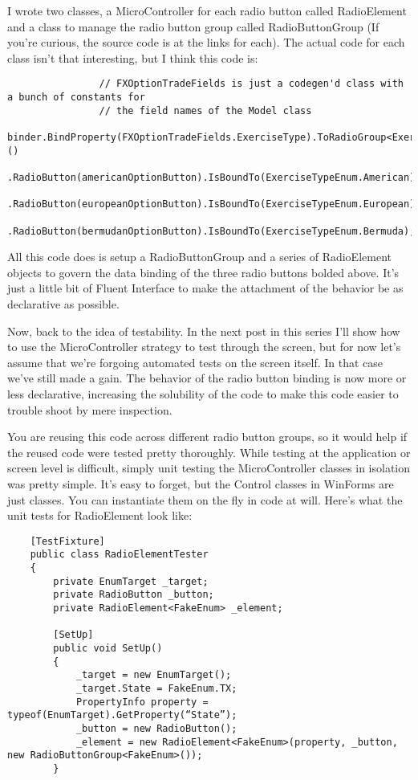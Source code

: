 \documentclass{article}
\begin{document}
{I wrote two classes, a MicroController for each radio button called RadioElement and a class to manage the radio button group called RadioButtonGroup (If you're curious, the source code is at the links for each).  The actual code for each class isn't that interesting, but I think this code is: 

\begin{lstlisting}
                // FXOptionTradeFields is just a codegen'd class with a bunch of constants for 
                // the field names of the Model class
                binder.BindProperty(FXOptionTradeFields.ExerciseType).ToRadioGroup<ExerciseTypeEnum>()
                    .RadioButton(americanOptionButton).IsBoundTo(ExerciseTypeEnum.American)
                    .RadioButton(europeanOptionButton).IsBoundTo(ExerciseTypeEnum.European)
                    .RadioButton(bermudanOptionButton).IsBoundTo(ExerciseTypeEnum.Bermuda);
\end{lstlisting}

All this code does is setup a RadioButtonGroup and a series of RadioElement objects to govern the data binding of the three radio buttons bolded above.   It's just a little bit of Fluent Interface to make the attachment of the behavior be as declarative as possible.

Now, back to the idea of testability.  In the next post in this series I'll show how to use the MicroController strategy to test through the screen, but for now let's assume that we're forgoing automated tests on the screen itself.  In that case we've still made a gain.  The behavior of the radio button binding is now more or less declarative, increasing the solubility of the code to make this code easier to trouble shoot by mere inspection.

You are reusing this code across different radio button groups, so it would help if the reused code were tested pretty thoroughly.  While testing at the application or screen level is difficult, simply unit testing the MicroController classes in isolation was pretty simple.  It's easy to forget, but the Control classes in WinForms are just classes.  You can instantiate them on the fly in code at will.  Here's what the unit tests for RadioElement look like:
\newpage
 \begin{lstlisting}
    [TestFixture]
    public class RadioElementTester
    {
        private EnumTarget _target;
        private RadioButton _button;
        private RadioElement<FakeEnum> _element; 

        [SetUp]
        public void SetUp()
        {
            _target = new EnumTarget();
            _target.State = FakeEnum.TX;
            PropertyInfo property = typeof(EnumTarget).GetProperty(“State”);
            _button = new RadioButton();
            _element = new RadioElement<FakeEnum>(property, _button, new RadioButtonGroup<FakeEnum>());
        } 


\end{lstlisting}}
\end{document}
